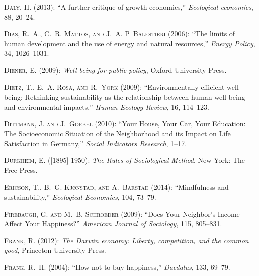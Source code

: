 \documentclass[10pt, letterpaper]{article}
\begin{document}
\begin{spacing}{1.4}
\begin{thebibliography}{36}
\textsc{Daly, H.} (2013): \enquote{A further critique of growth economics,}
  \emph{Ecological economics}, 88, 20--24.

\textsc{Dias, R.~A., C.~R. Mattos, and J.~A. P~Balestieri} (2006): \enquote{The
  limits of human development and the use of energy and natural resources,}
  \emph{Energy Policy}, 34, 1026--1031.

\textsc{Diener, E.} (2009): \emph{Well-being for public policy}, Oxford
  University Press.

\textsc{Dietz, T., E.~A. Rosa, and R.~York} (2009): \enquote{Environmentally
  efficient well-being: Rethinking sustainability as the relationship between
  human well-being and environmental impacts,} \emph{Human Ecology Review}, 16,
  114--123.

\textsc{Dittmann, J. and J.~Goebel} (2010): \enquote{{Your House, Your Car,
  Your Education: The Socioeconomic Situation of the Neighborhood and its
  Impact on Life Satisfaction in Germany},} \emph{Social Indicators Research},
  1--17.

\textsc{Durkheim, E.} ([1895] 1950): \emph{The Rules of Sociological Method},
  New York: The Free Press.

\textsc{Ericson, T., B.~G. Kj{\o}nstad, and A.~Barstad} (2014):
  \enquote{Mindfulness and sustainability,} \emph{Ecological Economics}, 104,
  73--79.

\textsc{Firebaugh, G. and M.~B. Schroeder} (2009): \enquote{Does Your
  Neighbor's Income Affect Your Happiness?} \emph{American Journal of
  Sociology}, 115, 805--831.

\textsc{Frank, R.} (2012): \emph{The Darwin economy: Liberty, competition, and
  the common good}, Princeton University Press.

\textsc{Frank, R.~H.} (2004): \enquote{How not to buy happiness,}
  \emph{Daedalus}, 133, 69--79.


\end{thebibliography}
\end{spacing}
\end{document}
